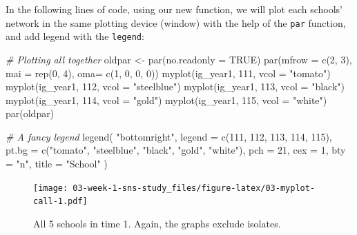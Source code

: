 \documentclass[
]{book}
\newenvironment{Shaded}{\begin{snugshade}}{\end{snugshade}}
\newcommand{\AttributeTok}[1]{\textcolor[rgb]{0.77,0.63,0.00}{#1}}
\newcommand{\CommentTok}[1]{\textcolor[rgb]{0.56,0.35,0.01}{\textit{#1}}}
\newcommand{\ConstantTok}[1]{\textcolor[rgb]{0.00,0.00,0.00}{#1}}
\newcommand{\DecValTok}[1]{\textcolor[rgb]{0.00,0.00,0.81}{#1}}
\newcommand{\FunctionTok}[1]{\textcolor[rgb]{0.00,0.00,0.00}{#1}}
\newcommand{\NormalTok}[1]{#1}
\newcommand{\OtherTok}[1]{\textcolor[rgb]{0.56,0.35,0.01}{#1}}
\newcommand{\StringTok}[1]{\textcolor[rgb]{0.31,0.60,0.02}{#1}}
\begin{document}
In the following lines of code, using our new function, we will plot each schools' network in the same plotting device (window) with the help of the \texttt{par} function, and add legend with the \texttt{legend}:

\begin{Shaded}
\begin{Highlighting}[]
\CommentTok{\# Plotting all together}
\NormalTok{oldpar }\OtherTok{\textless{}{-}} \FunctionTok{par}\NormalTok{(}\AttributeTok{no.readonly =} \ConstantTok{TRUE}\NormalTok{)}
\FunctionTok{par}\NormalTok{(}\AttributeTok{mfrow =} \FunctionTok{c}\NormalTok{(}\DecValTok{2}\NormalTok{, }\DecValTok{3}\NormalTok{), }\AttributeTok{mai =} \FunctionTok{rep}\NormalTok{(}\DecValTok{0}\NormalTok{, }\DecValTok{4}\NormalTok{), }\AttributeTok{oma=} \FunctionTok{c}\NormalTok{(}\DecValTok{1}\NormalTok{, }\DecValTok{0}\NormalTok{, }\DecValTok{0}\NormalTok{, }\DecValTok{0}\NormalTok{))}
\FunctionTok{myplot}\NormalTok{(ig\_year1, }\DecValTok{111}\NormalTok{, }\AttributeTok{vcol =} \StringTok{"tomato"}\NormalTok{)}
\FunctionTok{myplot}\NormalTok{(ig\_year1, }\DecValTok{112}\NormalTok{, }\AttributeTok{vcol =} \StringTok{"steelblue"}\NormalTok{)}
\FunctionTok{myplot}\NormalTok{(ig\_year1, }\DecValTok{113}\NormalTok{, }\AttributeTok{vcol =} \StringTok{"black"}\NormalTok{)}
\FunctionTok{myplot}\NormalTok{(ig\_year1, }\DecValTok{114}\NormalTok{, }\AttributeTok{vcol =} \StringTok{"gold"}\NormalTok{)}
\FunctionTok{myplot}\NormalTok{(ig\_year1, }\DecValTok{115}\NormalTok{, }\AttributeTok{vcol =} \StringTok{"white"}\NormalTok{)}
\FunctionTok{par}\NormalTok{(oldpar)}

\CommentTok{\# A fancy legend}
\FunctionTok{legend}\NormalTok{(}
  \StringTok{"bottomright"}\NormalTok{,}
  \AttributeTok{legend =} \FunctionTok{c}\NormalTok{(}\DecValTok{111}\NormalTok{, }\DecValTok{112}\NormalTok{, }\DecValTok{113}\NormalTok{, }\DecValTok{114}\NormalTok{, }\DecValTok{115}\NormalTok{),}
  \AttributeTok{pt.bg  =} \FunctionTok{c}\NormalTok{(}\StringTok{"tomato"}\NormalTok{, }\StringTok{"steelblue"}\NormalTok{, }\StringTok{"black"}\NormalTok{, }\StringTok{"gold"}\NormalTok{, }\StringTok{"white"}\NormalTok{),}
  \AttributeTok{pch    =} \DecValTok{21}\NormalTok{,}
  \AttributeTok{cex    =} \DecValTok{1}\NormalTok{,}
  \AttributeTok{bty    =} \StringTok{"n"}\NormalTok{,}
  \AttributeTok{title  =} \StringTok{"School"}
\NormalTok{  )}
\end{Highlighting}
\end{Shaded}

\begin{figure}
\centering
\texttt{[image: 03-week-1-sns-study\_files/figure-latex/03-myplot-call-1.pdf]}
\caption{\label{fig:03-myplot-call}All 5 schools in time 1. Again, the graphs exclude isolates.}
\end{figure}
\end{document}
